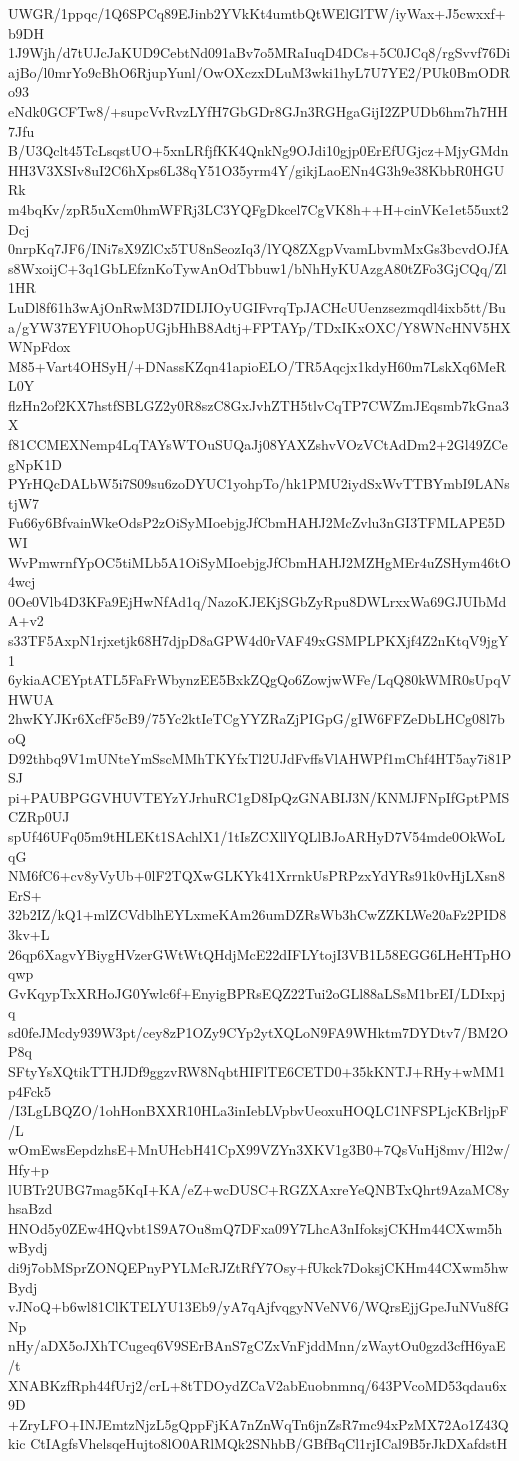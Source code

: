 UWGR/1ppqc/1Q6SPCq89EJinb2YVkKt4umtbQtWElGlTW/iyWax+J5cwxxf+b9DH
1J9Wjh/d7tUJcJaKUD9CebtNd091aBv7o5MRaIuqD4DCs+5C0JCq8/rgSvvf76Di
ajBo/l0mrYo9cBhO6RjupYunl/OwOXczxDLuM3wki1hyL7U7YE2/PUk0BmODRo93
eNdk0GCFTw8/+supcVvRvzLYfH7GbGDr8GJn3RGHgaGijI2ZPUDb6hm7h7HH7Jfu
B/U3Qclt45TcLsqstUO+5xnLRfjfKK4QnkNg9OJdi10gjp0ErEfUGjcz+MjyGMdn
HH3V3XSIv8uI2C6hXps6L38qY51O35yrm4Y/gikjLaoENn4G3h9e38KbbR0HGURk
m4bqKv/zpR5uXcm0hmWFRj3LC3YQFgDkcel7CgVK8h++H+cinVKe1et55uxt2Dcj
0nrpKq7JF6/INi7sX9ZlCx5TU8nSeozIq3/lYQ8ZXgpVvamLbvmMxGs3bcvdOJfA
s8WxoijC+3q1GbLEfznKoTywAnOdTbbuw1/bNhHyKUAzgA80tZFo3GjCQq/Zl1HR
LuDl8f61h3wAjOnRwM3D7IDIJIOyUGIFvrqTpJACHcUUenzsezmqdl4ixb5tt/Bu
a/gYW37EYFlUOhopUGjbHhB8Adtj+FPTAYp/TDxIKxOXC/Y8WNcHNV5HXWNpFdox
M85+Vart4OHSyH/+DNassKZqn41apioELO/TR5Aqcjx1kdyH60m7LskXq6MeRL0Y
flzHn2of2KX7hstfSBLGZ2y0R8szC8GxJvhZTH5tlvCqTP7CWZmJEqsmb7kGna3X
f81CCMEXNemp4LqTAYsWTOuSUQaJj08YAXZshvVOzVCtAdDm2+2Gl49ZCegNpK1D
PYrHQcDALbW5i7S09su6zoDYUC1yohpTo/hk1PMU2iydSxWvTTBYmbI9LANstjW7
Fu66y6BfvainWkeOdsP2zOiSyMIoebjgJfCbmHAHJ2McZvlu3nGI3TFMLAPE5DWI
WvPmwrnfYpOC5tiMLb5A1OiSyMIoebjgJfCbmHAHJ2MZHgMEr4uZSHym46tO4wcj
0Oe0Vlb4D3KFa9EjHwNfAd1q/NazoKJEKjSGbZyRpu8DWLrxxWa69GJUIbMdA+v2
s33TF5AxpN1rjxetjk68H7djpD8aGPW4d0rVAF49xGSMPLPKXjf4Z2nKtqV9jgY1
6ykiaACEYptATL5FaFrWbynzEE5BxkZQgQo6ZowjwWFe/LqQ80kWMR0sUpqVHWUA
2hwKYJKr6XcfF5cB9/75Yc2ktIeTCgYYZRaZjPIGpG/gIW6FFZeDbLHCg08l7boQ
D92thbq9V1mUNteYmSscMMhTKYfxTl2UJdFvffsVlAHWPf1mChf4HT5ay7i81PSJ
pi+PAUBPGGVHUVTEYzYJrhuRC1gD8IpQzGNABIJ3N/KNMJFNpIfGptPMSCZRp0UJ
spUf46UFq05m9tHLEKt1SAchlX1/1tIsZCXllYQLlBJoARHyD7V54mde0OkWoLqG
NM6fC6+cv8yVyUb+0lF2TQXwGLKYk41XrrnkUsPRPzxYdYRs91k0vHjLXsn8ErS+
32b2IZ/kQ1+mlZCVdblhEYLxmeKAm26umDZRsWb3hCwZZKLWe20aFz2PID83kv+L
26qp6XagvYBiygHVzerGWtWtQHdjMcE22dIFLYtojI3VB1L58EGG6LHeHTpHOqwp
GvKqypTxXRHoJG0Ywlc6f+EnyigBPRsEQZ22Tui2oGLl88aLSsM1brEI/LDIxpjq
sd0feJMcdy939W3pt/cey8zP1OZy9CYp2ytXQLoN9FA9WHktm7DYDtv7/BM2OP8q
SFtyYsXQtikTTHJDf9ggzvRW8NqbtHIFlTE6CETD0+35kKNTJ+RHy+wMM1p4Fck5
/I3LgLBQZO/1ohHonBXXR10HLa3inIebLVpbvUeoxuHOQLC1NFSPLjcKBrljpF/L
wOmEwsEepdzhsE+MnUHcbH41CpX99VZYn3XKV1g3B0+7QsVuHj8mv/Hl2w/Hfy+p
lUBTr2UBG7mag5KqI+KA/eZ+wcDUSC+RGZXAxreYeQNBTxQhrt9AzaMC8yhsaBzd
HNOd5y0ZEw4HQvbt1S9A7Ou8mQ7DFxa09Y7LhcA3nIfoksjCKHm44CXwm5hwBydj
di9j7obMSprZONQEPnyPYLMcRJZtRfY7Osy+fUkck7DoksjCKHm44CXwm5hwBydj
vJNoQ+b6wl81ClKTELYU13Eb9/yA7qAjfvqgyNVeNV6/WQrsEjjGpeJuNVu8fGNp
nHy/aDX5oJXhTCugeq6V9SErBAnS7gCZxVnFjddMnn/zWaytOu0gzd3cfH6yaE/t
XNABKzfRph44fUrj2/crL+8tTDOydZCaV2abEuobnmnq/643PVcoMD53qdau6x9D
+ZryLFO+INJEmtzNjzL5gQppFjKA7nZnWqTn6jnZsR7mc94xPzMX72Ao1Z43Qkic
CtIAgfsVhelsqeHujto8lO0ARlMQk2SNhbB/GBfBqCl1rjICal9B5rJkDXafdstH

